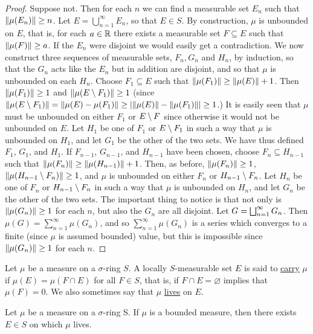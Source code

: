\begin{proof}
Suppose not. Then for each $n$ we can find a measurable set $E_n$ such that $\norm{\mu(E_n)}\geq n$. Let $E=\bigcup_{n=1}^\infty E_n$, so that $E \in S$. By construction, $\mu$ is unbounded on $E$, that is, for each $a\in\mathbb{R}$ there exists a measurable set $F \subseteq E$ such that $\norm{\mu(F)}\geq a$. If the $E_n$ were disjoint we would easily get a contradiction. We now construct three sequences of measurable sets, $F_n, G_n$ and $H_n$, by induction, so that the $G_n$ acts like the $E_n$ but in addition are disjoint, and so that $\mu$ is unbounded on each $H_n$. Choose $F_1 \subseteq E$ such that $\norm{\mu(F_1)}\geq\norm{\mu(E)}+1$. Then $\norm{\mu(F_1)}\geq1$ and $\norm{\mu(E\setminus F_1)}\geq1$ (since $\norm{\mu(E\setminus F_1)}=\norm{\mu(E)-\mu(F_1)}\geq|\norm{\mu(E)}-\norm{\mu(F_1)}|\geq1$.) It is easily seen that $\mu$ must be unbounded on either $F_1$ or $E\setminus F$ since otherwise it would not be unbounded on $E$. Let $H_1$ be one of $F_1$ or $E\setminus F_1$ in such a way that $\mu$ is unbounded on $H_1$, and let $G_1$ be the other of the two sets. We have thus defined $F_1$, $G_1$, and $H_1$. If $F_{n-1}$, $G_{n-1}$, and $H_{n-1}$ have been chosen, choose $F_n\subseteq H_{n-1}$ such that $\norm{\mu(F_n)}\geq\norm{\mu(H_{n-1})}+1$. Then, as before, $\norm{\mu(F_n)}\geq1$, $\norm{\mu(H_{n-1}\setminus F_n)}\geq1$, and $\mu$ is unbounded on either $F_n$ or $H_{n-1}\setminus F_n$. Let $H_n$ be one of $F_n$ or $H_{n-1}\setminus F_n$ in such a way that $\mu$ is unbounded on $H_n$, and let $G_n$ be the other of the two sets. The important thing to notice is that not only is $\norm{\mu(G_n)}\geq1$ for each $n$, but also the $G_n$ are all disjoint. Let $G=\bigsqcup_{n=1}^\infty G_n$. Then $\mu(G)=\sum_{n=1}^\infty\mu(G_n)$, and so $\sum_{n=1}^\infty\mu(G_n)$ is a series which converges to a finite (since $\mu$ is assumed bounded) value, but this is impossible since $\norm{\mu(G_n)}\geq1$ for each $n$.
\end{proof}

\begin{definition}
Let $\mu$ be a measure on a $\sigma$-ring $S$. A locally $S$-measurable set $E$ is said to \underline{carry} $\mu$ if $\mu(E)=\mu(F\cap E)$ for all $F\in S$, that is, if $F\cap E=\varnothing$ implies that $\mu(F)=0$. We also sometimes say that $\mu$ \underline{lives} on $E$.
\end{definition}

\begin{proposition}
Let $\mu$ be a measure on a $\sigma$-ring S. If $\mu$ is a bounded measure, then there exists $E \in S$ on which $\mu$ lives.
\end{proposition}

